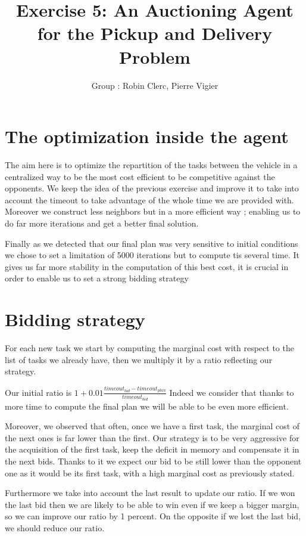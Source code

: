 \documentclass[11pt]{article}
\title{\bf Exercise 5: An Auctioning Agent for the Pickup and Delivery Problem}
\author{Group \textnumero 3: Robin Clerc, Pierre Vigier}
\begin{document}
\maketitle

\section{The optimization inside the agent}

The aim here is to optimize the repartition of the tasks between the vehicle in a centralized way to be the most cost efficient to be competitive against the opponents. We keep the idea of the previous exercise and improve it to take into account the timeout to take advantage of the whole time we are provided with.
Moreover we construct less neighbors but in a more efficient way ; enabling us to do far more iterations and get a better final solution.

Finally as we detected that our final plan was very sensitive to initial conditions we chose to set a limitation of 5000 iterations but to compute tis several time. It gives us far more stability in the computation of this best cost, it is crucial in order to enable us to set a strong bidding strategy

\section{Bidding strategy}

For each new task we start by computing the marginal cost with respect to the list of tasks we already have, then we multiply it by a ratio reflecting our strategy.

Our initial ratio is $1+0.01 \frac{timeout_{bid}-timeout_{plan}}{timeout_{bid}}$ Indeed we consider that thanks to more time to compute the final plan we will be able to be even more efficient.

Moreover, we observed that often, once we have a first task, the marginal cost of the next ones is far lower than the first. Our strategy is to be very aggressive for the acquisition of the first task, keep the deficit in memory and compensate it in the next bids. Thanks to it we expect our bid to be still lower than the opponent one as it would be its first task, with a high marginal cost as previously stated.

Furthermore we take into account the last result to update our ratio. If we won the last bid then we are likely to be able to win even if we keep a bigger margin, so we can improve our ratio by 1 percent. On the opposite if we lost the last bid, we should reduce our ratio.
\end{document}
